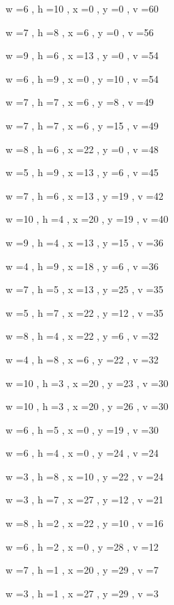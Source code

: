 \documentclass[11pt]{article}
\begin{document}
w =6 , h =10 , x =0 , y =0 , v =60
\par
w =7 , h =8 , x =6 , y =0 , v =56
\par
w =9 , h =6 , x =13 , y =0 , v =54
\par
w =6 , h =9 , x =0 , y =10 , v =54
\par
w =7 , h =7 , x =6 , y =8 , v =49
\par
w =7 , h =7 , x =6 , y =15 , v =49
\par
w =8 , h =6 , x =22 , y =0 , v =48
\par
w =5 , h =9 , x =13 , y =6 , v =45
\par
w =7 , h =6 , x =13 , y =19 , v =42
\par
w =10 , h =4 , x =20 , y =19 , v =40
\par
w =9 , h =4 , x =13 , y =15 , v =36
\par
w =4 , h =9 , x =18 , y =6 , v =36
\par
w =7 , h =5 , x =13 , y =25 , v =35
\par
w =5 , h =7 , x =22 , y =12 , v =35
\par
w =8 , h =4 , x =22 , y =6 , v =32
\par
w =4 , h =8 , x =6 , y =22 , v =32
\par
w =10 , h =3 , x =20 , y =23 , v =30
\par
w =10 , h =3 , x =20 , y =26 , v =30
\par
w =6 , h =5 , x =0 , y =19 , v =30
\par
w =6 , h =4 , x =0 , y =24 , v =24
\par
w =3 , h =8 , x =10 , y =22 , v =24
\par
w =3 , h =7 , x =27 , y =12 , v =21
\par
w =8 , h =2 , x =22 , y =10 , v =16
\par
w =6 , h =2 , x =0 , y =28 , v =12
\par
w =7 , h =1 , x =20 , y =29 , v =7
\par
w =3 , h =1 , x =27 , y =29 , v =3
\par
\newpage
\end{document}
